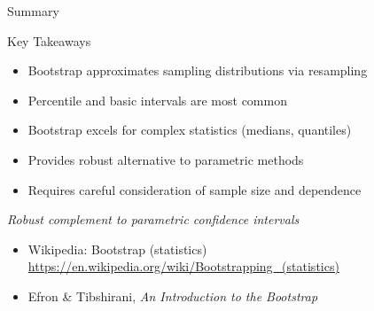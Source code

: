 \begin{frame}{Summary}
  \begin{block}{Key Takeaways}
    \begin{itemize}
      \item Bootstrap approximates sampling distributions via resampling
      \item Percentile and basic intervals are most common
      \item Bootstrap excels for complex statistics (medians, quantiles)
      \item Provides robust alternative to parametric methods
      \item Requires careful consideration of sample size and dependence
    \end{itemize}
  \end{block}

  \begin{center}
    \textit{Robust complement to parametric confidence intervals}
  \end{center}

  \footnotesize
  \begin{itemize}
    \item Wikipedia: Bootstrap (statistics) \url{https://en.wikipedia.org/wiki/Bootstrapping_(statistics)}
    \item Efron \& Tibshirani, \textit{An Introduction to the Bootstrap}
  \end{itemize}
\end{frame}